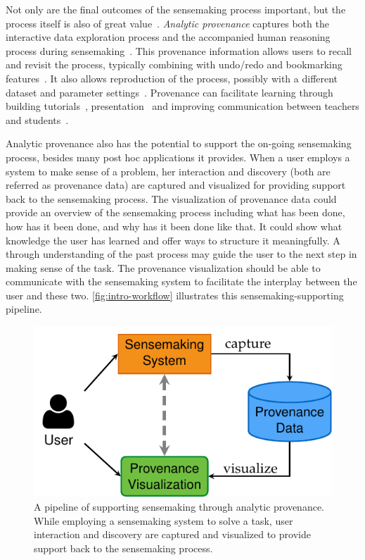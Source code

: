 Not only are the final outcomes of the sensemaking process important, but the process itself is also of great value~\cite{Ragan2016}. \emph{Analytic provenance} captures both the interactive data exploration process and the accompanied human reasoning process during sensemaking~\cite{Xu2015}. This provenance information allows users to recall and revisit the process, typically combining with undo/redo and bookmarking features~\cite{Heer2008}. It also allows reproduction of the process, possibly with a different dataset and parameter settings~\cite{Davidson2007}. Provenance can facilitate learning through building tutorials~\cite{Grabler2009}, presentation~\cite{Eccles2007} and improving communication between teachers and students~\cite{Plaisant1999}. 

Analytic provenance also has the potential to support the on-going sensemaking process, besides many post hoc applications it provides. When a user employs a system to make sense of a problem, her interaction and discovery (both are referred as provenance data) are captured and visualized for providing support back to the sensemaking process. The visualization of provenance data could  provide an overview of the sensemaking process including what has been done, how has it been done, and why has it been done like that. It could show what knowledge the user has learned and offer ways to structure it meaningfully. A through understanding of the past process may guide the user to the next step in making sense of the task. The provenance visualization should be able to communicate with the sensemaking system to facilitate the interplay between the user and these two. \autoref{fig:intro-workflow} illustrates this sensemaking-supporting pipeline. 

\begin{figure}[!htb]
	\centering
	\includegraphics{workflow}
	\caption{A pipeline of supporting sensemaking through analytic provenance. While employing a sensemaking system to solve a task, user interaction and discovery are captured and visualized to provide support back to the sensemaking process.}
	\label{fig:intro-workflow}
\end{figure}

